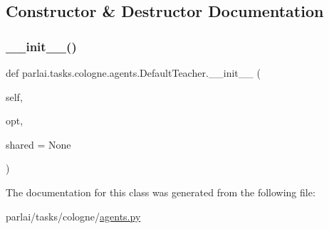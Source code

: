 \subsection{Constructor \& Destructor Documentation}
\mbox{\label{classparlai_1_1tasks_1_1cologne_1_1agents_1_1DefaultTeacher_ad318d4fbe6bd62f2bafb48324d4c4efe}} 
\subsubsection{\texorpdfstring{\+\_\+\+\_\+init\+\_\+\+\_\+()}{\_\_init\_\_()}}
{\footnotesize\ttfamily def parlai.\+tasks.\+cologne.\+agents.\+Default\+Teacher.\+\_\+\+\_\+init\+\_\+\+\_\+ (\begin{DoxyParamCaption}\item[{}]{self,  }\item[{}]{opt,  }\item[{}]{shared = {\ttfamily None} }\end{DoxyParamCaption})}



The documentation for this class was generated from the following file\+:\begin{DoxyCompactItemize}
\item 
parlai/tasks/cologne/\hyperlink{parlai_2tasks_2cologne_2agents_8py}{agents.\+py}\end{DoxyCompactItemize}
